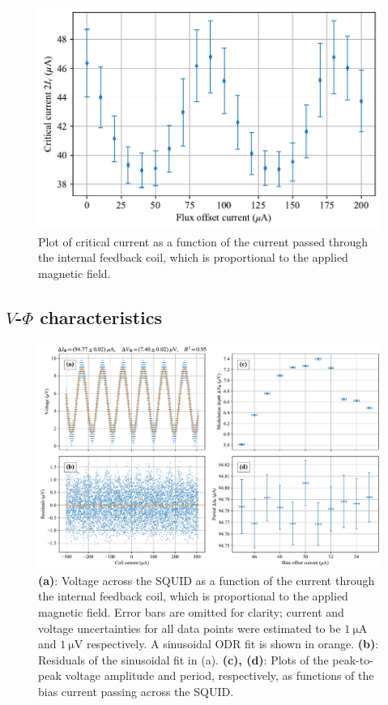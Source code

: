 \documentclass[twocol]{ametsocV6.1}
\begin{document}
\begin{figure}[ht]
	\centering
	\includegraphics[width=\linewidth]{../figures/Ic_vs_flux.pdf}
	\caption{
		Plot of critical current as a function of the current passed
		through the internal feedback coil, which is proportional to
		the applied magnetic field.
	}
	\label{fig:Ic_vs_flux}
\end{figure}

\subsection{$V$-$\Phi$ characteristics} \label{sec:vphi}
\begin{figure}[ht]
	\centering
	\includegraphics[width=\linewidth]{../figures/vphi.pdf}
	\caption{
		\textbf{(a)}: Voltage across the SQUID as a function of the current through the
		internal feedback coil, which is proportional to the applied magnetic
		field. Error bars are omitted for clarity;
		current and voltage uncertainties for all data points
		were estimated to be $\SI{1}{\micro\ampere}$ and $\SI{1}{\micro\volt}$
		respectively. A sinusoidal ODR fit is shown in orange.
		\textbf{(b)}: Residuals of the sinusoidal fit in (a).
		\textbf{(c), (d)}: Plots of the peak-to-peak voltage amplitude
		and period, respectively, as functions
		of the bias current passing across the SQUID.
	}
	\label{fig:vphi}
\end{figure}
\end{document}
